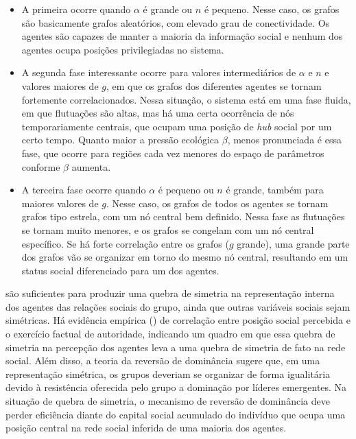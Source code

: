 \begin{itemize}
 \item A primeira ocorre quando $\alpha$ é grande ou $n$ é pequeno. Nesse caso, os grafos são basicamente grafos aleatórios, com elevado grau de conectividade. Os agentes são capazes de manter a maioria da informação social e nenhum dos agentes ocupa posições privilegiadas no sistema.
 
 \item A segunda fase interessante ocorre para valores intermediários de $\alpha$ e $n$ e valores maiores de $g$, em que os grafos dos diferentes agentes se tornam fortemente correlacionados. Nessa situação, o sistema está em uma fase fluida, em que flutuações são altas, mas há uma certa ocorrência de nós temporariamente centrais, que ocupam uma posição de \textit{hub} social por um certo tempo. Quanto maior a pressão ecológica $\beta$, menos pronunciada é essa fase, que ocorre para regiões cada vez menores do espaço de parâmetros conforme $\beta$ aumenta.
 
 
\item  A terceira fase ocorre quando $\alpha$ é pequeno ou $n$ é grande, também para maiores valores de $g$. Nesse caso, os grafos de todos os agentes se tornam grafos tipo estrela, com um nó central bem definido. Nessa fase as flutuações se tornam muito menores, e os grafos se congelam com um nó central específico. Se há forte correlação entre os grafos ($g$ grande), uma grande parte dos grafos vão se organizar em torno do mesmo nó central, resultando em um status social diferenciado para um dos agentes. 
\end{itemize}

 são suficientes para produzir uma quebra de simetria na representação interna dos agentes das relações sociais do grupo, ainda que outras variáveis sociais sejam simétricas. Há evidência empírica\cite{Earle1997, Wiessner2002} (\citet{Earle1997, Wiessner2002}) de correlação entre posição social percebida e o exercício factual de autoridade, indicando um quadro em que essa quebra de simetria na percepção dos agentes leva a uma quebra de simetria de fato na rede social. Além disso, a teoria da reversão de dominância sugere que, em uma representação simétrica, os grupos deveriam se organizar de forma igualitária devido à resistência oferecida pelo grupo a dominação por líderes emergentes. Na situação de quebra de simetria, o mecanismo de reversão de dominância deve perder eficiência diante do capital social acumulado do indivíduo que ocupa uma posição central na rede social inferida de uma maioria dos agentes.


